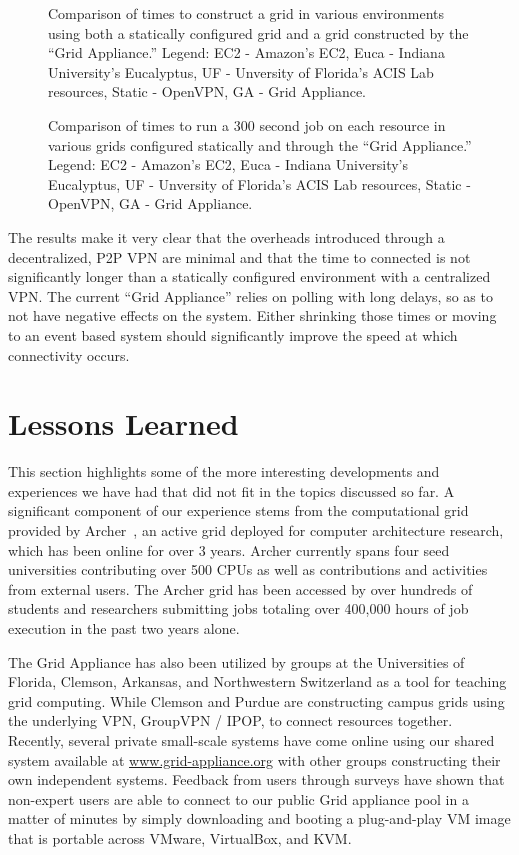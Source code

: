 \documentclass[conference]{IEEEtran}
\begin{document}
\begin{figure}[ht]
\centering
{}
\caption{Comparison of times to construct a grid in various environments using
both a statically configured grid and a grid constructed by the ``Grid
Appliance.''  Legend:  EC2 - Amazon's EC2, Euca - Indiana University's
Eucalyptus, UF - Unversity of Florida's ACIS Lab resources, Static - OpenVPN,
GA - Grid Appliance.}
\label{fig:connect}
\end{figure}

\begin{figure}[ht]
\centering
{}
\caption{Comparison of times to run a 300 second job on each resource in
various grids configured statically and through the ``Grid Appliance.''
Legend:  EC2 - Amazon's EC2, Euca - Indiana University's Eucalyptus, UF -
Unversity of Florida's ACIS Lab resources, Static - OpenVPN, GA - Grid
Appliance.}
\label{fig:run}
\end{figure}

The results make it very clear that the overheads introduced through a
decentralized, P2P VPN are minimal and that the time to connected is not
significantly longer than a statically configured environment with a
centralized VPN.  The current ``Grid Appliance'' relies on polling with long
delays, so as to not have negative effects on the system.  Either shrinking
those times or moving to an event based system should significantly improve the
speed at which connectivity occurs.  

\section{Lessons Learned}
\label{lessons_learned}

This section highlights some of the more interesting developments and
experiences we have had that did not fit in the topics discussed so far.  A
significant component of our experience stems from the computational grid
provided by Archer~\cite{archer}, an active grid deployed for computer
architecture research, which has been online for over 3 years.  Archer
currently spans four seed universities contributing over 500 CPUs as well as
contributions and activities from external users.  The Archer grid has been
accessed by over hundreds of students and researchers submitting jobs totaling
over 400,000 hours of job execution in the past two years alone.

The Grid Appliance has also been utilized by groups at the Universities of
Florida, Clemson, Arkansas, and Northwestern Switzerland as a tool for teaching
grid computing.  While Clemson and Purdue are constructing campus grids using
the underlying VPN, GroupVPN / IPOP, to connect resources together.  Recently,
several private small-scale systems have come online using our shared system
available at \url{www.grid-appliance.org} with other groups constructing their
own independent systems.  Feedback from users through surveys have shown that
non-expert users are able to connect to our public Grid appliance pool in a
matter of minutes by simply downloading and booting a plug-and-play VM image
that is portable across VMware, VirtualBox, and KVM.
\end{document}
